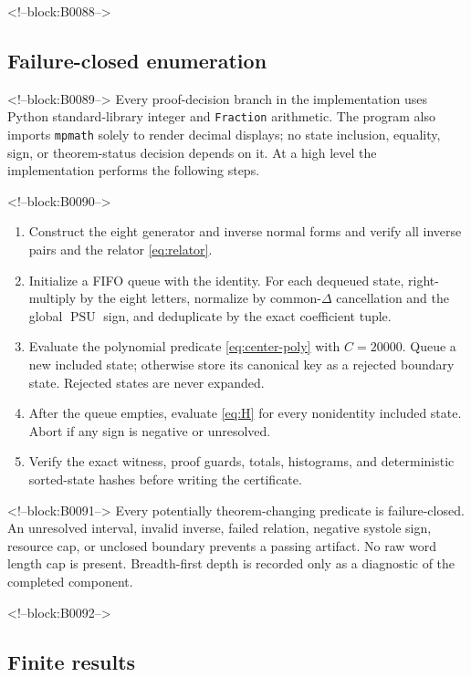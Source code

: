 \documentclass[11pt,a4paper]{article}
\theoremstyle{definition}
\newcommand{\PSU}{\operatorname{PSU}}
\begin{document}
<!--block:B0088-->
\subsection{Failure-closed enumeration}

<!--block:B0089-->
Every proof-decision branch in the implementation uses Python
standard-library integer and \texttt{Fraction} arithmetic.  The program also
imports \texttt{mpmath} solely to render decimal displays; no state inclusion,
equality, sign, or theorem-status decision depends on it.  At a high level the
implementation performs the following steps.

<!--block:B0090-->
\begin{enumerate}[leftmargin=*,label=\arabic*.]
 \item Construct the eight generator and inverse normal forms and verify all
       inverse pairs and the relator \eqref{eq:relator}.
 \item Initialize a FIFO queue with the identity.  For each dequeued state,
       right-multiply by the eight letters, normalize by common-\(\Delta\)
       cancellation and the global \(\PSU\) sign, and deduplicate by the exact
       coefficient tuple.
 \item Evaluate the polynomial predicate \eqref{eq:center-poly} with
       \(C=20000\).  Queue a new included state; otherwise store its canonical
       key as a rejected boundary state.  Rejected states are never expanded.
 \item After the queue empties, evaluate \eqref{eq:H} for every nonidentity
       included state.  Abort if any sign is negative or unresolved.
 \item Verify the exact witness, proof guards, totals, histograms, and
       deterministic sorted-state hashes before writing the certificate.
\end{enumerate}

<!--block:B0091-->
Every potentially theorem-changing predicate is failure-closed.  An
unresolved interval, invalid inverse, failed relation, negative systole sign,
resource cap, or unclosed boundary prevents a passing artifact.  No raw word
length cap is present.  Breadth-first depth is recorded only as a diagnostic
of the completed component.

<!--block:B0092-->
\subsection{Finite results}
\end{document}
